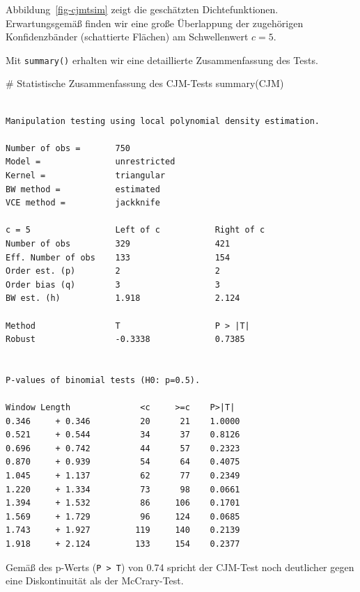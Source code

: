 \documentclass[
  a4paper,
  DIV=11,
  oneside]{scrreprt}
\newenvironment{Shaded}{\begin{snugshade}}{\end{snugshade}}
\newcommand{\CommentTok}[1]{\textcolor[rgb]{0.37,0.37,0.37}{#1}}
\newcommand{\FunctionTok}[1]{\textcolor[rgb]{0.28,0.35,0.67}{#1}}
\newcommand{\NormalTok}[1]{\textcolor[rgb]{0.00,0.23,0.31}{#1}}
\begin{document}
Abbildung~\ref{fig-cjmtsim} zeigt die geschätzten Dichtefunktionen.
Erwartungsgemäß finden wir eine große Überlappung der zugehörigen
Konfidenzbänder (schattierte Flächen) am Schwellenwert \(c=5\).

Mit \texttt{summary()} erhalten wir eine detaillierte Zusammenfassung
des Tests.

\begin{Shaded}
\begin{Highlighting}[]
\CommentTok{\# Statistische Zusammenfassung des CJM{-}Tests}
\FunctionTok{summary}\NormalTok{(CJM)}
\end{Highlighting}
\end{Shaded}

\begin{verbatim}

Manipulation testing using local polynomial density estimation.

Number of obs =       750
Model =               unrestricted
Kernel =              triangular
BW method =           estimated
VCE method =          jackknife

c = 5                 Left of c           Right of c          
Number of obs         329                 421                 
Eff. Number of obs    133                 154                 
Order est. (p)        2                   2                   
Order bias (q)        3                   3                   
BW est. (h)           1.918               2.124               

Method                T                   P > |T|             
Robust                -0.3338             0.7385              


P-values of binomial tests (H0: p=0.5).

Window Length              <c     >=c    P>|T|
0.346     + 0.346          20      21    1.0000
0.521     + 0.544          34      37    0.8126
0.696     + 0.742          44      57    0.2323
0.870     + 0.939          54      64    0.4075
1.045     + 1.137          62      77    0.2349
1.220     + 1.334          73      98    0.0661
1.394     + 1.532          86     106    0.1701
1.569     + 1.729          96     124    0.0685
1.743     + 1.927         119     140    0.2139
1.918     + 2.124         133     154    0.2377
\end{verbatim}

Gemäß des p-Werts (\texttt{P\ \textgreater{}\ \textbar{}T\textbar{}})
von 0.74 spricht der CJM-Test noch deutlicher gegen eine Diskontinuität
als der McCrary-Test.
\end{document}
